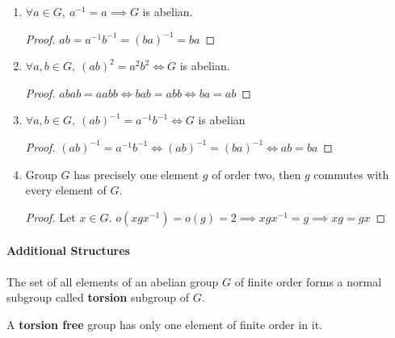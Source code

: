 \begin{enumerate}
	\item $\forall a \in G,\ a^{-1} = a \implies G$ is abelian.
	\begin{proof}
		$ab = a^{-1}b^{-1} = (ba)^{-1} = ba$
	\end{proof}
	\item $\forall a,b \in G,\ (ab)^2 = a^2b^2 \iff G$ is abelian.
	\begin{proof}
		$abab = aabb \iff bab = abb \iff ba = ab$
	\end{proof}
	\item $\forall a,b \in G,\ (ab)^{-1} = a^{-1}b^{-1} \iff G$ is abelian
	\begin{proof}
		$(ab)^{-1} = a^{-1}b^{-1} \iff (ab)^{-1} = (ba)^{-1} \iff ab = ba$
	\end{proof}
	\item Group $G$ has precisely one element $g$ of order two, then $g$ commutes with every element of $G$.
	\begin{proof}
		Let $x \in G$.
		$o(xgx^{-1}) = o(g) = 2 \implies xgx^{-1} = g \implies xg = gx$
	\end{proof}
\end{enumerate}

\paragraph{Additional Structures}
\begin{definition}
	The set of all elements of an abelian group $G$ of finite order forms a normal subgroup called \textbf{torsion} subgroup of $G$.
\end{definition}

\begin{definition}
	A \textbf{torsion free} group has only one element of finite order in it.
\end{definition}

